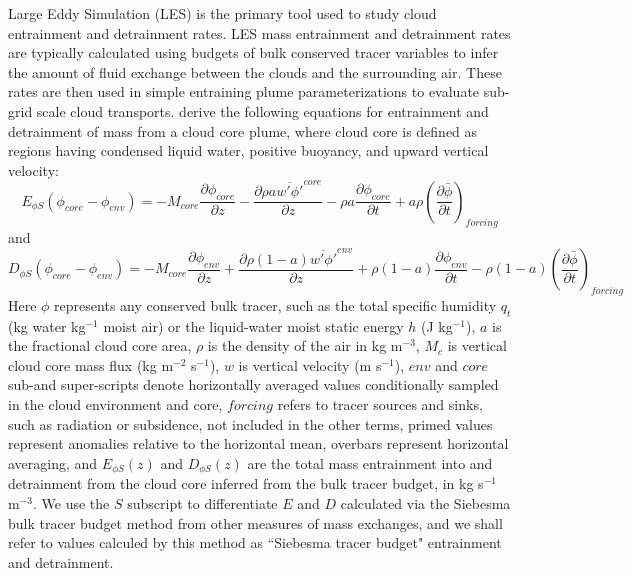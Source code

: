 \documentclass[12pt]{article}
\begin{document}
Large Eddy Simulation (LES) is the primary tool used to study cloud entrainment
and detrainment rates.  LES mass entrainment and detrainment rates are typically
calculated using budgets of bulk conserved tracer variables to infer the amount
of fluid exchange between the clouds and the surrounding air.  These rates are
then used in simple entraining plume parameterizations to evaluate sub-grid 
scale cloud transports.  \cite{Siebesma1995} derive the following equations for
entrainment and detrainment of mass from a cloud core plume, where cloud core 
is defined as regions having condensed liquid water, positive buoyancy, and 
upward vertical velocity:
\begin{equation}
  \label{eq:siebesma_entrainment}
    E_{\phi S}(\phi_{core} - \phi_{env}) = - M_{core} \frac{\partial \phi_{core}}{\partial z}
        - \frac{\partial \rho a \overline{w' \phi'}^{core}}{\partial z}
        - \rho a \frac{\partial \phi_{core}}{\partial t}
        + a \rho \left(\frac{\partial \bar{\phi}}{\partial t}\right)_{forcing}
\end{equation}
and
\begin{equation}
  \label{eq:siebesma_detrainment}
    D_{\phi S}(\phi_{core} - \phi_{env}) = - M_{core} \frac{\partial \phi_{env}}{\partial z}
        + \frac{\partial \rho (1 - a) \overline{w' \phi'}^{env}}{\partial z}
        + \rho (1-a) \frac{\partial \phi_{env}}{\partial t}
     - \rho (1-a) \left(\frac{\partial \bar{\phi}}{\partial t}\right)_{forcing}
\end{equation}
Here $\phi$ represents any conserved bulk tracer, such as the total specific 
humidity $q_t$ (kg water kg$^{-1}$ moist air) or the liquid-water moist static 
energy $h$ (J kg$^{-1}$), $a$ is the fractional cloud core area, $\rho$ is the
density of the air in kg m$^{-3}$, $M_c$ is vertical cloud core mass flux 
(kg m$^{-2}$ s$^{-1}$), $w$ is vertical velocity (m s$^{-1}$), $env$ and 
$core$ sub-and super-scripts denote horizontally averaged values conditionally
sampled in the cloud environment and core, $forcing$ refers to tracer sources 
and sinks, such as radiation or subsidence, not included in the other terms,
primed values represent anomalies relative to the horizontal mean, overbars
represent horizontal averaging, and $E_{\phi S}(z)$ and $D_{\phi S}(z)$ are the 
total mass entrainment into and detrainment from the cloud core inferred from 
the bulk tracer budget, in kg s$^{-1}$ m$^{-3}$.  We use the $S$ subscript
to differentiate $E$ and $D$ calculated via the Siebesma bulk tracer budget 
method from other measures of mass exchanges, and we shall refer to values calculed by this method as ``Siebesma tracer budget" entrainment and 
detrainment.
\end{document}
